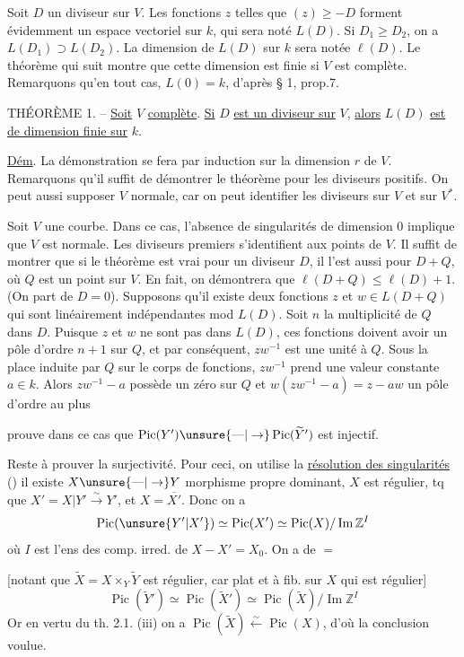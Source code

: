 Soit $D$ un diviseur sur $V$. Les fonctions $z$ telles que $(z)\geq-D$ forment évidemment un espace vectoriel sur $k$, qui sera noté $L(D)$. Si $D_1\geq D_2$, on a $L(D_1)\supset L(D_2)$. La dimension de $L(D)$ sur $k$ sera notée $\ell(D)$. Le théorème qui suit montre que cette dimension est finie si $V$ est complète. Remarquons qu'en tout cas, $L(0)=k$, d'après § 1, prop.7.

THÉORÈME 1. -- \uline{Soit} $V$ \uline{complète}. \uline{Si} $D$ \uline{est un diviseur sur} $V$, \uline{alors} $L(D)$ \uline{est de dimension finie sur} $k$.

\uline{Dém}. La démonstration se fera par induction sur la dimension $r$ de $V$. Remarquons qu'il suffit de démontrer le théorème pour les diviseurs positifs. On peut aussi supposer $V$ normale, car on peut identifier les diviseurs sur $V$ et sur $V^*$.

Soit $V$ une courbe. Dans ce cas, l'absence de singularités de dimension $0$ implique que $V$ est normale. Les diviseurs premiers s'identifient aux points de $V$. Il suffit de montrer que si le théorème est vrai pour un diviseur $D$, il l'est aussi pour $D+Q$, où $Q$ est un point sur $V$. En fait, on démontrera que $\ell(D+Q)\leq\ell(D)+1$. (On part de $D=0$). Supposons qu'il existe deux fonctions $z$ et $w\in L(D+Q)$ qui sont linéairement indépendantes mod $L(D)$. Soit $n$ la multiplicité de $Q$ dans $D$. Puisque $z$ et $w$ ne sont pas dans $L(D)$, ces fonctions doivent avoir un pôle d'ordre $n+1$ sur $Q$, et par conséquent, $zw^{-1}$ est une unité à $Q$. Sous la place induite par $Q$ sur le corps de fonctions, $zw^{-1}$ prend une valeur constante $a\in k$. Alors $zw^{-1}-a$ possède un zéro sur $Q$ et $w(zw^{-1}-a)=z-aw$ un pôle d'ordre au plus


 prouve dans ce cas que $\operatorname{Pic}(Y')\unsure{\text{---}|\to}\operatorname{Pic}(\widetilde Y')$ est injectif.

Reste à prouver la surjectivité. Pour ceci, on utilise la \uline{résolution des singularités} () il existe $X\unsure{\text{---}|\to}Y$ morphisme propre dominant, $X$ est régulier, tq que $X'=X|Y'\overset{\sim}{\longrightarrow}Y'$, et $X=\overline{X'}$. Donc on a
\[
\operatorname{Pic}(\unsure{Y'|X'})\simeq\operatorname{Pic}(X')\simeq\operatorname{Pic}(X)/\operatorname{Im}\mathbb Z^I
\]
où $I$ est l'ens des comp. irred. de $X-X'=X_0$. On a de $=$

[notant que $\widetilde X=X\times_Y\widetilde Y$ est régulier, car plat et  à fib.  sur $X$ qui est régulier]
\[
\operatorname{Pic}(\widetilde Y')\simeq\operatorname{Pic}(\widetilde X')\simeq\operatorname{Pic}(\widetilde X)/\operatorname{Im}\mathbb Z^I
\]
Or en vertu du th. 2.1. (iii) on a $\operatorname{Pic}(\widetilde X)\overset{\sim}{\longleftarrow}\operatorname{Pic}(X)$, d'où la conclusion voulue.

